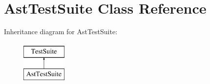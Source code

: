 \hypertarget{classAstTestSuite}{\section{Ast\-Test\-Suite Class Reference}
\label{classAstTestSuite}
}
Inheritance diagram for Ast\-Test\-Suite\-:\begin{figure}[H]
\begin{center}
\leavevmode
\includegraphics[height=2.000000cm]{classAstTestSuite}
\end{center}
\end{figure}
